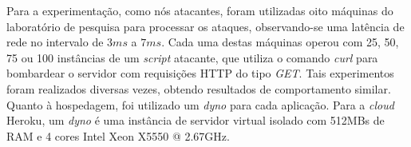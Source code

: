 Para a experimentação, como nós atacantes, foram utilizadas oito máquinas do laboratório de pesquisa 
para processar os ataques, observando-se uma latência de rede no intervalo de $3ms$ a $7ms$. Cada uma destas máquinas operou com 25, 50, 75 ou 100 instâncias de um \emph{script} atacante, que utiliza o comando \emph{curl} para bombardear o servidor com requisições HTTP do tipo \emph{GET}. Tais experimentos foram realizados diversas vezes, obtendo resultados de comportamento similar. Quanto à hospedagem, foi utilizado um \emph{dyno} para cada aplicação. Para a \emph{cloud} Heroku, um \emph{dyno} é uma instância de servidor virtual isolado com 512MBs de RAM e 4 cores Intel Xeon X5550 @ 2.67GHz. %


